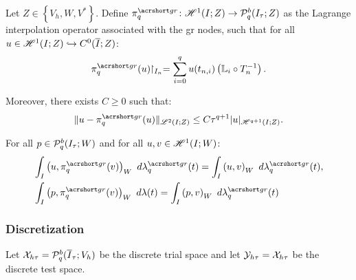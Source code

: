 \begin{definition}[$\InterpolantGR_q$] \label{def:interpolant_gr}
    Let $Z \in \left\{V_h, W, V^* \right\}$. Define $\InterpolantGR_q \colon \SpaceHk{1}(I; Z) \rightarrow \SpacePolynomials{q}^b(\TimeMesh; Z)$ as the Lagrange interpolation operator associated with the \acrshort{gr} nodes, such that for all $u \in \mathscr{H}^{1}(I; Z) \hookrightarrow C^0(\overline{I}; Z)$:
    \begin{align}
        \InterpolantGR_q(u) \Restriction_{I_n} = \sum_{i = 0}^q u(t_{n, i}) \left( \Lagrange_i \circ T_n^{-1} \right).
    \end{align}

    Moreover, there exists $C \geq 0$ such that:
    \begin{align}
        \lVert u - \InterpolantGR_q(u) \rVert_{\SpaceLp{2}(I; Z)} \leq C \tau^{q + 1} \lvert u \rvert_{\SpaceHk{q + 1}(I; Z)}.
    \end{align}
\end{definition}

\begin{proposition}
    For all $p \in \mathcal{P}_{q}^b(I_{\tau}; W)$ and for all $u, v \in \mathscr{H}^{1}(I; W)$:
    \begin{align}
        & \int_I \left( u, \InterpolantGR_q(v) \right)_W ~ d \lambdaGR_q(t) = \int_I \left( u, v \right)_W ~ d \lambdaGR_q(t), \\
        & \int_I \left( p, \InterpolantGR_q(v) \right)_W ~ d \lambda(t) = \int_I \left( p, v \right)_W ~ d \lambdaGR_q(t)
    \end{align}
\end{proposition}

\subsubsection{Discretization}

\begin{definition}
    Let $\mathcal{X}_{h \tau} = \mathcal{P}_{q}^b(\overline{I}_{\tau}; V_h)$ be the discrete trial space and let $\mathcal{Y}_{h \tau} = \mathcal{X}_{h \tau}$ be the discrete test space.
\end{definition}

